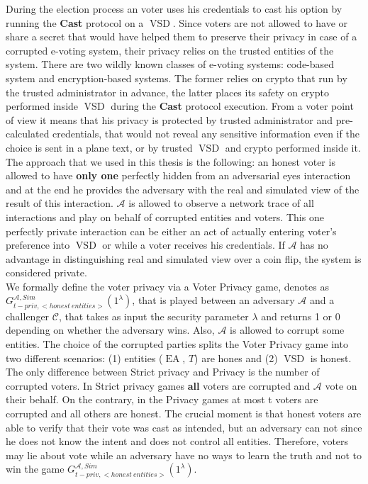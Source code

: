 \documentclass[12pt]{article}
\DeclareMathOperator{\vsd}{VSD}
\DeclareMathOperator{\ea}{EA}
\begin{document}
During the election process an voter uses his credentials to cast his option by running the \textbf{Cast} protocol on a $\vsd$. Since voters are not allowed to have or share a secret that would have helped them to preserve their privacy in case of a corrupted e-voting system, their privacy relies on the trusted entities of the system. There are two wildly known classes of e-voting systems: code-based system and encryption-based systems. The former relies on crypto that run by the trusted administrator in advance, the latter places its safety on crypto performed inside $\vsd$ during the \textbf{Cast} protocol execution. From a voter point of view it means that his privacy is protected by trusted administrator and pre-calculated credentials, that would not reveal any sensitive information even if the choice is sent in a plane text, or by trusted $\vsd$ and crypto performed inside it. \\

The approach that we used in this thesis is the following: an honest voter is allowed to have  \textbf{only one} perfectly hidden from an adversarial eyes interaction and at the end he provides the adversary with the real and simulated view of the result of this interaction. $\mathcal{A}$ is allowed to observe a network trace of all interactions and play on behalf of corrupted entities and voters. This one perfectly private interaction can be either an act of actually entering voter's preference into $\vsd$ or while a voter receives his credentials. If $\mathcal{A}$  has no advantage in distinguishing real and simulated view over a coin flip, the system is considered private. \\

We formally define the voter privacy via a Voter Privacy game, denotes as $G_{t-priv,<honest~entities>}^{\mathcal{A}, Sim}(1^{\lambda})$, that is played between an adversary $\mathcal{A}$ and a challenger $\mathcal{C}$, that takes as input the security parameter $\lambda$ and returns 1 or 0 depending on whether the adversary wins.  Also, $\mathcal{A}$ is  allowed to corrupt some entities. The choice of the corrupted parties splits the Voter Privacy game into two different scenarios: (1) entities ($\ea$, $T$) are hones and (2) $\vsd$ is honest. \\
The only difference between Strict privacy and Privacy is the number of corrupted voters. In Strict privacy games \textbf{all} voters are corrupted and  $\mathcal{A}$ vote on their behalf. On the contrary, in the Privacy games at most t voters are corrupted and all others are honest. The crucial moment is that honest voters are able to verify that their vote was cast as intended, but an adversary can not since he does not know the intent and does not control all entities. Therefore, voters may lie about vote while an adversary have no ways to learn the truth and not to win the game $G_{t-priv,<honest~entities>}^{\mathcal{A}, Sim}(1^{\lambda})$. 
\end{document}

